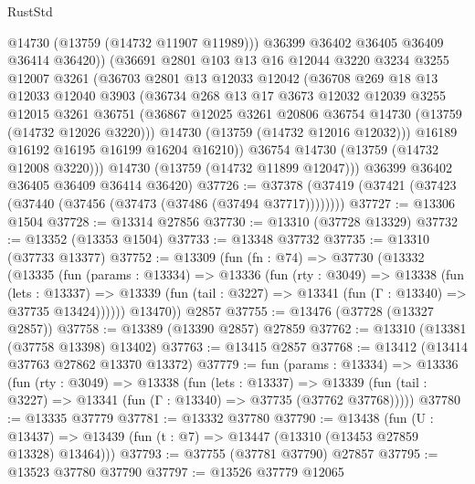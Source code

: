 \begin{lexlean}{RustStd}
\begin{coremodule}
              @14730
              (@13759 (@14732 @11907 @11989)))
            @36399
            @36402
            @36405
            @36409
            @36414
            @36420))
        (@36691
          @2801
          @103
          @13
          @16
          @12044
          @3220
          @3234
          @3255
          @12007
          @3261
          (@36703
            @2801
            @13
            @12033
            @12042
            (@36708
              @269
              @18
              @13
              @12033
              @12040
              @3903
              (@36734
                @268
                @13
                @17
                @3673
                @12032
                @12039
                @3255
                @12015
                @3261
                @36751
                (@36867 @12025 @3261 @20806 @36754 @14730 (@13759 (@14732 @12026 @3220)))
                @14730
                (@13759 (@14732 @12016 @12032)))
              @16189
              @16192
              @16195
              @16199
              @16204
              @16210))
          @36754
          @14730
          (@13759 (@14732 @12008 @3220)))
        @14730
        (@13759 (@14732 @11899 @12047)))
      @36399
      @36402
      @36405
      @36409
      @36414
      @36420)
@37726 := @37378 (@37419 (@37421 (@37423 (@37440 (@37456 (@37473 (@37486 (@37494 @37717))))))))
@37727 := @13306 @1504
@37728 := @13314 @27856
@37730 := @13310 (@37728 @13329)
@37732 := @13352 (@13353 @1504)
@37733 := @13348 @37732
@37735 := @13310 (@37733 @13377)
@37752 := @13309
    (fun (fn : @74) =>
    @37730
      (@13332
        (@13335
          (fun (params : @13334) =>
          @13336
            (fun (rty : @3049) =>
            @13338
              (fun (lets : @13337) =>
              @13339 (fun (tail : @3227) => @13341 (fun (Γ : @13340) => @37735 @13424))))))
        @13470))
    @2857
@37755 := @13476 (@37728 (@13327 @2857))
@37758 := @13389 (@13390 @2857) @27859
@37762 := @13310 (@13381 (@37758 @13398) @13402)
@37763 := @13415 @2857
@37768 := @13412 (@13414 @37763 @27862 @13370 @13372)
@37779 := fun (params : @13334) =>
  @13336
    (fun (rty : @3049) =>
    @13338
      (fun (lets : @13337) =>
      @13339 (fun (tail : @3227) => @13341 (fun (Γ : @13340) => @37735 (@37762 @37768)))))
@37780 := @13335 @37779
@37781 := @13332 @37780
@37790 := @13438
    (fun (U : @13437) => @13439 (fun (t : @7) => @13447 (@13310 (@13453 @27859 @13328) @13464)))
@37793 := @37755 (@37781 @37790) @27857
@37795 := @13523 @37780 @37790
@37797 := @13526 @37779 @12065

\end{coremodule}
\end{lexlean}

